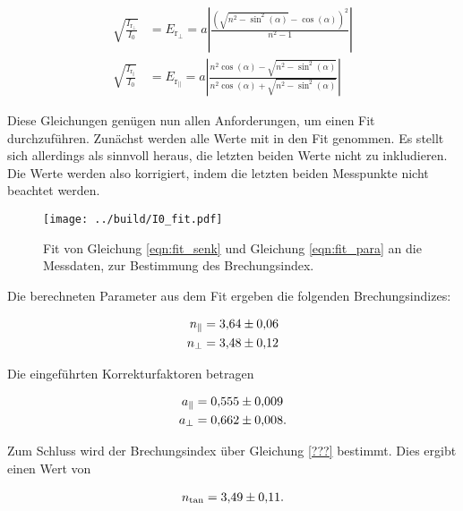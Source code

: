 \begin{align}
    \sqrt{\frac{I_{\text{r}_\bot}}{I_0}} &= E_{\text{r}_\bot} = a \left| \frac{\left( \sqrt{n^2 - \sin^2(\alpha)} - \cos(\alpha) \right)^2}{ n^2 -1 } \right| 
    \label{eqn:fit_senk}\\
    \sqrt{\frac{I_{\text{r}_\parallel}}{I_0}} &= E_{\text{r}_\parallel} = a \left| \frac{n^2 \cos(\alpha) - \sqrt{n^2 - \sin^2(\alpha)} }{ n^2 \cos(\alpha) + \sqrt{n^2 - \sin^2(\alpha)}} \right|
    \label{eqn:fit_para}
\end{align}

\noindent Diese Gleichungen genügen nun allen Anforderungen, um einen Fit durchzuführen. Zunächst werden alle Werte mit in den Fit genommen. Es stellt sich allerdings als sinnvoll 
heraus, die letzten beiden Werte nicht zu inkludieren. Die Werte werden also korrigiert, indem die letzten beiden Messpunkte nicht beachtet werden.


\begin{figure}[H]
    \centering
    \texttt{[image: ../build/I0\_fit.pdf]}
    \caption{Fit von Gleichung \eqref{eqn:fit_senk} und Gleichung \eqref{eqn:fit_para} an die Messdaten, zur Bestimmung des Brechungsindex. }
\end{figure}

\noindent Die berechneten Parameter aus dem Fit ergeben die folgenden Brechungsindizes:

\begin{align*}
    n_\parallel &= \num{3.64 \pm 0.06}\\
    n_\bot      &= \num{3.48 \pm 0.12}
\end{align*}

\noindent Die eingeführten Korrekturfaktoren betragen  

\begin{align*}
    a_\parallel &= \num{0.555 \pm 0.009}\\
    a_\bot      &= \num{0.662 \pm 0.008}.
\end{align*}

\noindent Zum Schluss wird der Brechungsindex über Gleichung \eqref{???} bestimmt. Dies ergibt einen Wert von 

\begin{align*}
    n_\text{tan} = \num{3.49\pm0.11}.
\end{align*}



    
